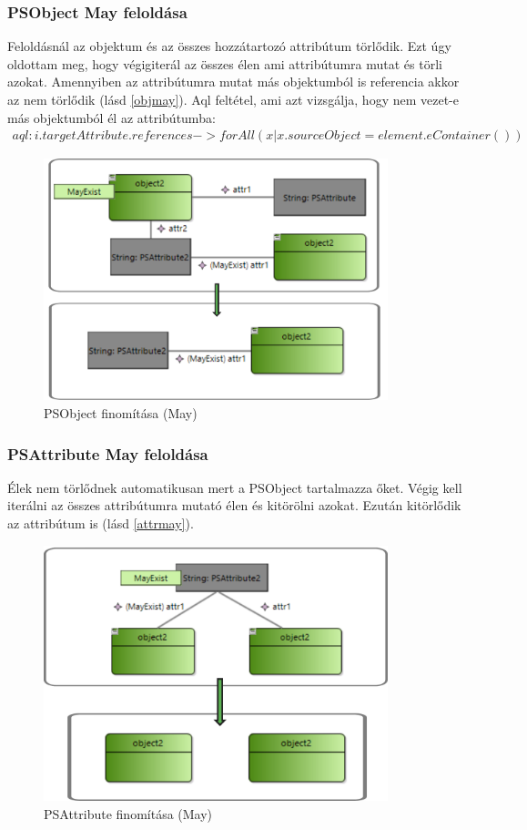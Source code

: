\subsubsection{PSObject May feloldása}
Feloldásnál az objektum és az összes hozzátartozó attribútum törlődik. Ezt úgy oldottam meg, hogy végigiterál az összes élen ami attribútumra mutat és törli azokat. Amennyiben az attribútumra mutat más objektumból is referencia akkor az nem törlődik (lásd \autoref{objmay}).
Aql feltétel, ami azt vizsgálja, hogy nem vezet-e más objektumból él az attribútumba:
\begin{align}
 aql:i.targetAttribute.references->forAll(x | x.sourceObject = element.eContainer())
\end{align}
\begin{figure}[!ht]
	\centering
	\includegraphics[width=100mm]{figures/objmay.pdf}
	\caption{PSObject finomítása (May)}
	\label{objmay} 
\end{figure}

\subsubsection{PSAttribute May feloldása}
Élek nem törlődnek automatikusan mert a PSObject tartalmazza őket. Végig kell iterálni az összes attribútumra mutató élen és kitörölni azokat. Ezután kitörlődik az attribútum is (lásd \autoref{attrmay}). 
\begin{figure}[!ht]
	\centering
	\includegraphics[width=100mm]{figures/attrmay.pdf}
	\caption{PSAttribute finomítása (May)}
	\label{attrmay} 
\end{figure}

